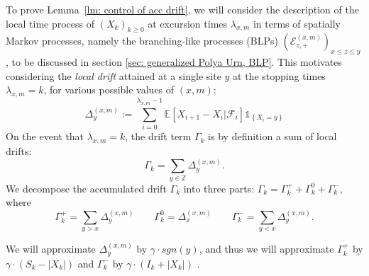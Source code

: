 \documentclass[EJP]{ejpecp} %
\newcommand{\abs}[1]{\left\vert #1 \right\vert}
\begin{document}
To prove Lemma~\ref{lm: control of acc drift}, we will consider the description of the local time process of $(X_k)_{k \ge 0}$ at excursion times $\lambda_{x,m}$ in terms of spatially Markov processes, namely the branching-like processes (BLPs) $\left( \mathcal{E}^{(x,m)}_{z,+} \right)_{x \le z \leq y}$, to be discussed in section \ref{sec: generalized Polya Urn, BLP}. This motivates considering the \textit{local drift} attained at a single site $y$ at the stopping times $\lambda_{x, m} = k$, for various possible values of $(x,m)$:
\begin{equation}\label{eq: accumulated local drift}
	\Delta_y^{(x,m)}:= \sum_{i=0}^{\lambda_{x,m}-1} \mathbb{E}\left[X_{i+1}-X_i\vert \mathcal{F}_{i}\right] \mathbb{1}_{\left\{X_i=y\right\}}
\end{equation}
On the event that $\lambda_{x,m} = k$, the drift term $\Gamma_k$ is by definition a sum of local drifts:
\begin{equation}\label{eq: drift in terms of local drifts}
	\Gamma_k = \sum_{y\in \mathbb{Z}} \Delta_y^{(x,m)}
	.\end{equation}
We decompose the accumulated drift $\Gamma_k$ into three parts: $\Gamma_k = 	\Gamma_k^+ +	\Gamma_k^0 + \Gamma_k^-$, where 
\[
\Gamma_k^{+} = \sum_{y > x} \Delta_y^{(x,m)}\qquad 
\Gamma_k^{0} = \Delta_x^{(x,m)} \qquad
\Gamma_k^{-} = \sum_{y < x} \Delta_y^{(x,m)}
.\]
\iffalse
\begin{align*}
	\Gamma_k^{+ \phantom{0}} &= \sum_{y > x} \Delta_y^{(x,m)}\\
	\Gamma_k^{0 \phantom{+}} &= \Delta_x^{(x,m)} \\[0.6em]
	\Gamma_k^{- \phantom{0}} &= \sum_{y < x} \Delta_{y}^{(x,m)}
	.\end{align*} 
\fi
We will approximate $\Delta_y^{(x,m)}$ by $\gamma\cdot sgn(y)$, and thus we will approximate $\Gamma_k^+$ by $\gamma \cdot (S_k - \abs{X_k})$ and $\Gamma_k^-$ by $ \gamma \cdot (I_k + \abs{X_k} )$
.
\end{document}
